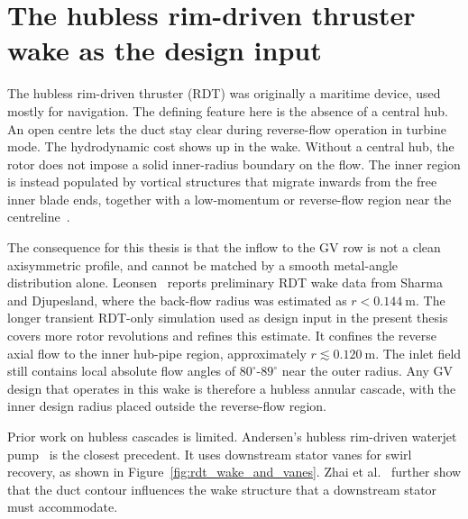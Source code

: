 \section{The hubless rim-driven thruster wake as the design input}
\label{sec:lit_rdt_wake}
 
The hubless rim-driven thruster (RDT) was originally a maritime device, used mostly for navigation. The defining feature here is the absence of a central hub. An open centre lets the duct stay clear during reverse-flow operation in turbine mode. The hydrodynamic cost shows up in the wake. Without a central hub, the rotor does not impose a solid inner-radius boundary on the flow. The inner region is instead populated by vortical structures that migrate inwards from the free inner blade ends, together with a low-momentum or reverse-flow region near the centreline~\cite{Gaggero2023}.
 
The consequence for this thesis is that the inflow to the GV row is not a clean axisymmetric profile, and cannot be matched by a smooth metal-angle distribution alone. Leonsen~\cite{Leonsen2025} reports preliminary RDT wake data from Sharma and Djupesland, where the back-flow radius was estimated as \(r < 0.144~\mathrm{m}\). The longer transient RDT-only simulation used as design input in the present thesis covers more rotor revolutions and refines this estimate. It confines the reverse axial flow to the inner hub-pipe region, approximately \(r \lesssim 0.120~\mathrm{m}\). The inlet field still contains local absolute flow angles of \(80^\circ\)-\(89^\circ\) near the outer radius. Any GV design that operates in this wake is therefore a hubless annular cascade, with the inner design radius placed outside the reverse-flow region.
 
Prior work on hubless cascades is limited. Andersen's hubless rim-driven waterjet pump~\cite{Andersen2014} is the closest precedent. It uses downstream stator vanes for swirl recovery, as shown in Figure~\ref{fig:rdt_wake_and_vanes}. Zhai et al.~\cite{Zhai2022} further show that the duct contour influences the wake structure that a downstream stator must accommodate.
 
